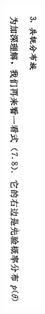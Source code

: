 \documentclass{article}
\begin{document}
\begin{figure}[h]
    \centering
    \includegraphics[width=1.05\columnwidth]{figs/conjugate_family1.png}
\end{figure}
\end{document}
